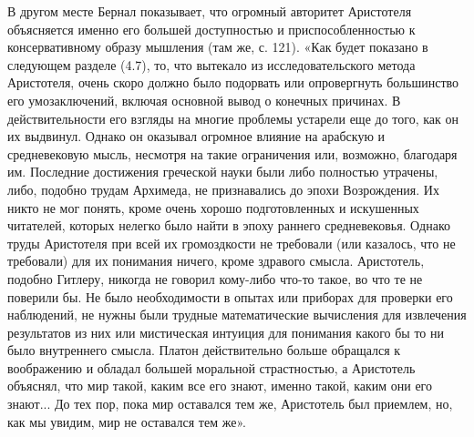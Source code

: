 В другом  месте Бернал  показывает, что огромный  авторитет Аристотеля
объясняется  именно его  большей доступностью  и приспособленностью  к
консервативному образу мышления (там же,  с. 121). «Как будет показано
в  следующем разделе  (4.7),  то, что  вытекало из  исследовательского
метода Аристотеля, очень скоро  должно было подорвать или опровергнуть
большинство  его  умозаключений,  включая основной  вывод  о  конечных
причинах. В  действительности его взгляды на  многие проблемы устарели
еще до того,  как он их выдвинул. Однако он  оказывал огромное влияние
на арабскую и средневековую мысль,  несмотря на такие ограничения или,
возможно, благодаря им. Последние достижения греческой науки были либо
полностью утрачены, либо, подобно  трудам Архимеда, не признавались до
эпохи  Возрождения.  Их  никто  не  мог  понять,  кроме  очень  хорошо
подготовленных и  искушенных читателей,  которых нелегко было  найти в
эпоху  раннего  средневековья. Однако  труды  Аристотеля  при всей  их
громоздкости  не требовали  (или казалось,  что не  требовали) для  их
понимания ничего, кроме здравого  смысла. Аристотель, подобно Гитлеру,
никогда  не говорил  кому-либо что-то  такое,  во что  те не  поверили
бы.  Не было  необходимости в  опытах  или приборах  для проверки  его
наблюдений,  не  нужны  были  трудные  математические  вычисления  для
извлечения результатов  из них или мистическая  интуиция для понимания
какого бы то  ни было внутреннего смысла.  Платон действительно больше
обращался к  воображению и  обладал большей моральной  страстностью, а
Аристотель объяснял, что мир такой, каким все его знают, именно такой,
каким  они  его знают...  До  тех  пор,  пока  мир оставался  тем  же,
Аристотель был приемлем, но, как мы увидим, мир не оставался тем же».


